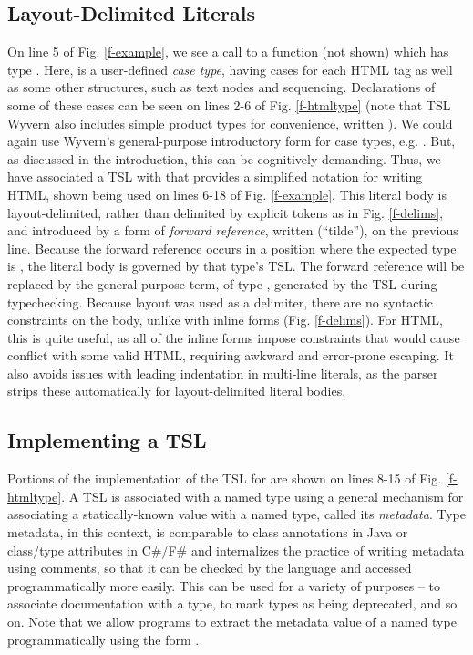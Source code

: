 \subsection{Layout-Delimited Literals}


On line 5 of Fig. \ref{f-example}, we see a call to a function  (not shown) which has type . Here,  is a user-defined \emph{case type}, having cases for each HTML tag as well as some other structures, such as text nodes and sequencing. Declarations  of some of these cases can be seen on lines 2-6 of Fig. \ref{f-htmltype} (note that TSL Wyvern also includes simple product types for convenience, written ). We could again use Wyvern's general-purpose introductory form for case types, e.g. . But, as discussed in the introduction, this can be cognitively demanding. Thus, we have associated a TSL with  that provides a simplified notation for writing HTML, shown being used on lines 6-18 of Fig. \ref{f-example}. This literal body is layout-delimited, rather than delimited by explicit tokens as in Fig. \ref{f-delims}, and introduced by a form of \emph{forward reference}, written \li{~} (``tilde''), on the previous line. Because the forward reference occurs in a position where the expected type is , the literal body is governed by that type's TSL. The forward reference will be replaced by the general-purpose term, of type , generated by the TSL during typechecking. Because layout was used as a delimiter, there are no syntactic constraints on the body, unlike with inline forms (Fig. \ref{f-delims}). For HTML, this is quite useful, as all of the inline forms impose constraints that would cause conflict with some valid HTML, requiring awkward and error-prone escaping. It also avoids issues with leading indentation in multi-line literals, as the parser strips these automatically for layout-delimited literal bodies.
\subsection{Implementing a TSL}
Portions of the implementation of the TSL for  are shown on lines 8-15 of Fig. \ref{f-htmltype}. A TSL is associated with a named type using a general mechanism for associating a statically-known value with a named type, called its \emph{metadata}. Type metadata, in this context, is comparable to class annotations in Java or class/type attributes in C\#/F\# and internalizes the practice of writing metadata using comments, so that it can be checked by the language and accessed programmatically more easily. This can be used for a variety of purposes -- to associate documentation with a type, to mark types as being deprecated, and so on. Note that we allow programs to extract the metadata value of a named type  programmatically using the form .

